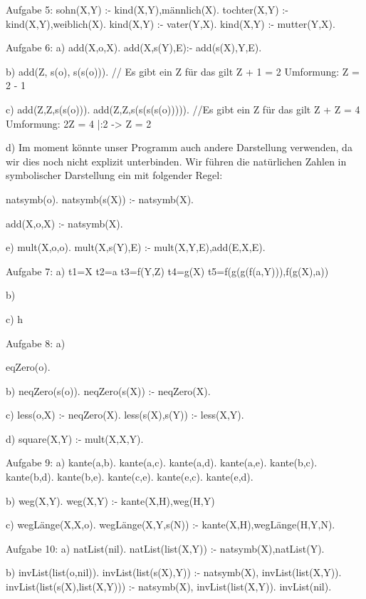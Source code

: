 Aufgabe 5:
sohn(X,Y) :- kind(X,Y),männlich(X).
tochter(X,Y) :- kind(X,Y),weiblich(X).
kind(X,Y) :- vater(Y,X).
kind(X,Y) :- mutter(Y,X).

Aufgabe 6:
a)
add(X,o,X).
add(X,s(Y),E):- add(s(X),Y,E).

b)
add(Z, s(o), s(s(o))). // Es gibt ein Z für das gilt Z + 1 = 2 Umformung: Z = 2 - 1

c)
add(Z,Z,s(s(o))).
add(Z,Z,s(s(s(s(o))))). //Es gibt ein Z für das gilt Z + Z = 4 Umformung: 2Z = 4 |:2 -> Z = 2

d)
Im moment könnte unser Programm auch andere Darstellung verwenden, da wir dies noch nicht explizit unterbinden.
Wir führen die natürlichen Zahlen in symbolischer Darstellung ein mit folgender Regel:

natsymb(o).
natsymb(s(X)) :- natsymb(X).

add(X,o,X) :- natsymb(X).

e)
mult(X,o,o).
mult(X,s(Y),E) :- mult(X,Y,E),add(E,X,E).

Aufgabe 7:
a)
t1=X t2=a t3=f(Y,Z) t4=g(X) t5=f(g(g(f(a,Y))),f(g(X),a))

b)

c)
h


Aufgabe 8:
a)

eqZero(o).

b)
neqZero(s(o)).
neqZero(s(X)) :-  neqZero(X).

c)
less(o,X) :- neqZero(X).
less(s(X),s(Y)) :- less(X,Y).

d)
square(X,Y) :- mult(X,X,Y).


Aufgabe 9:
a)
kante(a,b).
kante(a,c).
kante(a,d).
kante(a,e).
kante(b,c).
kante(b,d).
kante(b,e).
kante(c,e).
kante(e,c).
kante(e,d).
 
b)
weg(X,Y).
weg(X,Y) :- kante(X,H),weg(H,Y)

c)
wegLänge(X,X,o).
wegLänge(X,Y,s(N)) :- kante(X,H),wegLänge(H,Y,N).


Aufgabe 10:
a)
natList(nil).
natList(list(X,Y)) :- natsymb(X),natList(Y).

b)
invList(list(o,nil)).
invList(list(s(X),Y)) :- natsymb(X), invList(list(X,Y)).
invList(list(s(X),list(X,Y))) :- natsymb(X), invList(list(X,Y)).
invList(nil).
